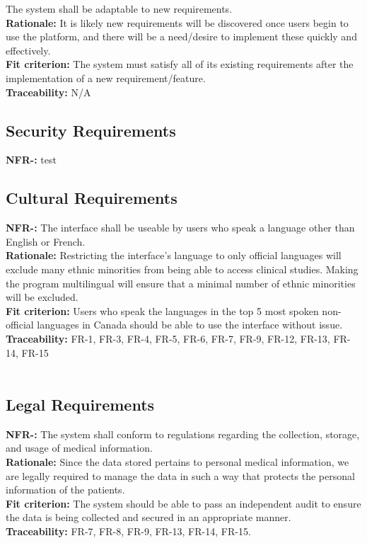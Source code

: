 \documentclass[12pt, titlepage]{article}
\newcounter{NFR_Counter}
\newcounter{FR_Counter}
\begin{document}
The system shall be adaptable to new requirements.\\
\textbf{Rationale:}
It is likely new requirements will be discovered once users begin to use the platform, and there will be a need/desire to 
implement these quickly and effectively.\\
\textbf{Fit criterion:}
The system must satisfy all of its existing requirements after the implementation of a new requirement/feature.\\
\textbf{Traceability:}
N/A
\addtocounter{NFR_Counter}{1}


\subsection{Security Requirements}
\noindent\textbf{NFR-\the\value{NFR_Counter}:}
test
\addtocounter{NFR_Counter}{1}

\subsection{Cultural Requirements}
\noindent\textbf{NFR-\the\value{NFR_Counter}:}
The interface shall be useable by users who speak a language other than English or French.  \\
\textbf{Rationale:}
Restricting the interface's language to only official languages will exclude many ethnic minorities from being able to access clinical studies. Making the program multilingual will ensure that a minimal number of ethnic minorities will be excluded. \\
\textbf{Fit criterion:}
Users who speak the languages in the top 5 most spoken non-official languages in Canada should be able to use the interface without issue. \\
\textbf{Traceability:}
FR-1, FR-3, FR-4, FR-5, FR-6, FR-7, FR-9, FR-12, FR-13, FR-14, FR-15 \\~\\
\addtocounter{NFR_Counter}{1}

\subsection{Legal Requirements}
\noindent\textbf{NFR-\the\value{NFR_Counter}:}
The system shall conform to regulations regarding the collection, storage, and usage of medical information.  \\
\textbf{Rationale:}
Since the data stored pertains to personal medical information, we are legally required to manage the data in such a way that protects the personal information of the patients. \\
\textbf{Fit criterion:}
The system should be able to pass an independent audit to ensure the data is being collected and secured in an appropriate manner. \\
\textbf{Traceability:}
FR-7, FR-8, FR-9, FR-13, FR-14, FR-15. \\~\\
\addtocounter{NFR_Counter}{1}
\end{document}
